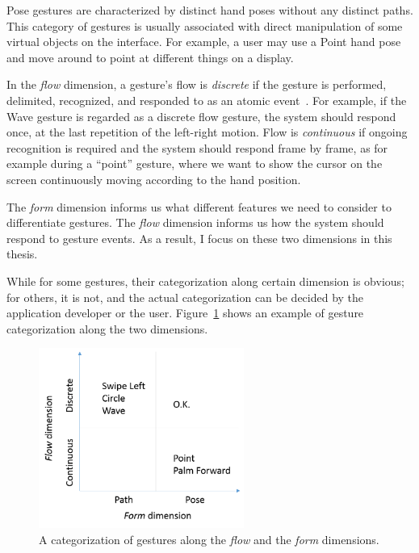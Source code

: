 Pose
gestures are characterized by distinct hand poses without any distinct paths.
This category of gestures is usually associated with direct manipulation of some virtual
objects on the interface.
For example, a user may use a Point hand pose and move around to
point at different things on a display.

In the \textit{flow} dimension, a gesture's flow is
\textit{discrete} if the gesture is performed, delimited, recognized, and
responded to as an atomic event~\cite{wobbrock09}. For example, if the Wave gesture is
regarded as a discrete flow gesture, the system should respond once, at the last
repetition of the left-right motion. Flow is \textit{continuous} if ongoing
recognition is required and the system should respond frame by frame, as for example during a ``point'' gesture, where we want to show the cursor on the screen
continuously moving according to the hand position. 

The \textit{form} dimension informs us what different features we need to
consider to differentiate gestures.
The \textit{flow} dimension informs us how the system should respond to gesture
events. As a result, I focus on these two dimensions in this thesis. 

While for
some gestures, their categorization along certain dimension is obvious; for
others, it is not, and the actual categorization can be decided by the
application developer or the user. Figure~\ref{fig:flow-form} shows an example
of gesture categorization along the two dimensions.

\begin{figure}[tbh]
\centering
\includegraphics[width=0.6\textwidth]{figures/flow_form.png}
\caption{A categorization of gestures along the \textit{flow} and the
\textit{form} dimensions.}
\label{fig:flow-form}
\end{figure}

